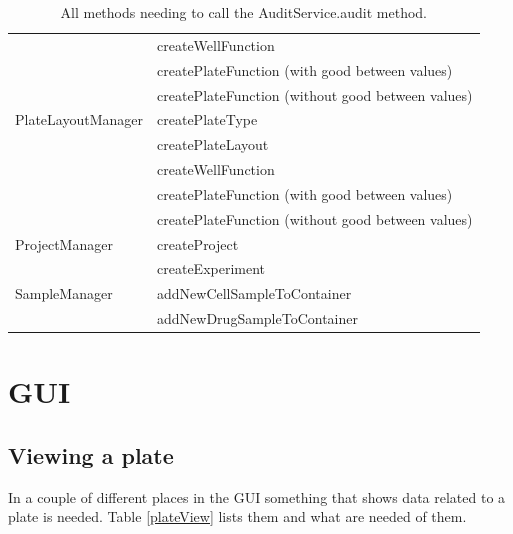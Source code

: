 \documentclass[a4paper,10pt]{article}
\begin{document}
\begin{table}[hbt]
\begin{center}
{\begin{tabular}{|l|l|}
    			             & createWellFunction \\
    			             & createPlateFunction (with good between values) \\
    			             & createPlateFunction (without good between 
                               values) \\
    		\hline
    			PlateLayoutManager & createPlateType \\
    			                   & createPlateLayout \\
    			                   & createWellFunction \\
    			                   & createPlateFunction (with good between
                                     values) \\
    			                   & createPlateFunction (without good between
                                     values) \\
    		\hline
    			ProjectManager & createProject \\
    			               & createExperiment \\
    		\hline
    			SampleManager & addNewCellSampleToContainer \\
    			              & addNewDrugSampleToContainer \\
    		\hline
	    \end{tabular}
	}
		\end{center}
		
	   	\caption{All methods needing to call the AuditService.audit method. }
	   	\label{auditservicecallers}
	\end{table}
	
    \section{GUI}
        \subsection{Viewing a plate}

            In a couple of different places in the GUI something that shows
            data related to a plate is needed. Table \ref{plateView} lists them
            and what are needed of them.
\end{document}
